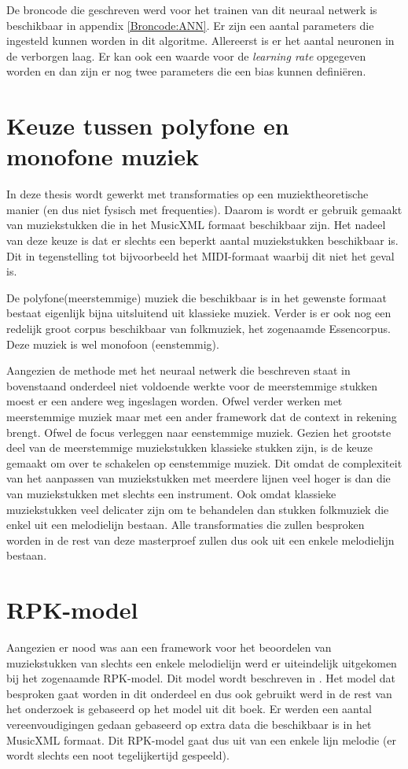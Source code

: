 De broncode die geschreven werd voor het trainen van dit neuraal netwerk is beschikbaar in appendix \ref{Broncode:ANN}. Er zijn een aantal parameters die ingesteld kunnen worden in dit algoritme. Allereerst is er het aantal neuronen in de verborgen laag. Er kan ook een waarde voor de \textit{learning rate} opgegeven worden en dan zijn er nog twee parameters die een bias kunnen defini\"eren.

\section{Keuze tussen polyfone en monofone muziek}
\label{OBM:OMM}
In deze thesis wordt gewerkt met transformaties op een muziektheoretische manier (en dus niet fysisch met frequenties). Daarom is wordt er gebruik gemaakt van muziekstukken die in het MusicXML\cite{url:musicxml} formaat beschikbaar zijn. Het nadeel van deze keuze is dat er slechts een beperkt aantal muziekstukken beschikbaar is. Dit in tegenstelling tot bijvoorbeeld het MIDI-formaat\cite{url:midi} waarbij dit niet het geval is. 

De polyfone(meerstemmige) muziek die beschikbaar is in het gewenste formaat bestaat eigenlijk bijna uitsluitend uit klassieke muziek. Verder is er ook nog een redelijk groot corpus beschikbaar van folkmuziek, het zogenaamde Essencorpus\cite{url:essen}. Deze muziek is wel monofoon (eenstemmig).

Aangezien de methode met het neuraal netwerk die beschreven staat in bovenstaand onderdeel niet voldoende werkte voor de meerstemmige stukken moest er een andere weg ingeslagen worden. Ofwel verder werken met meerstemmige muziek maar met een ander framework dat de context in rekening brengt. Ofwel de focus verleggen naar eenstemmige muziek. Gezien het grootste deel van de meerstemmige muziekstukken klassieke stukken zijn, is de keuze gemaakt om over te schakelen op eenstemmige muziek. Dit omdat de complexiteit van het aanpassen van muziekstukken met meerdere lijnen veel hoger is dan die van muziekstukken met slechts een instrument. Ook omdat klassieke muziekstukken veel delicater zijn om te behandelen dan stukken folkmuziek die enkel uit een melodielijn bestaan. Alle transformaties die zullen besproken worden in de rest van deze masterproef zullen dus ook uit een enkele melodielijn bestaan.

\section{RPK-model}
\label{OBM:RPK}
Aangezien er nood was aan een framework voor het beoordelen van muziekstukken van slechts een enkele melodielijn werd er uiteindelijk uitgekomen bij het zogenaamde RPK-model. Dit model wordt beschreven in \cite{book:musicAndProbability}. Het model dat besproken gaat worden in dit onderdeel en dus ook gebruikt werd in de rest van het onderzoek is gebaseerd op het model uit dit boek. Er werden een aantal vereenvoudigingen gedaan gebaseerd op extra data die beschikbaar is in het MusicXML formaat. Dit RPK-model gaat dus uit van een enkele lijn melodie (er wordt slechts een noot tegelijkertijd gespeeld). 

